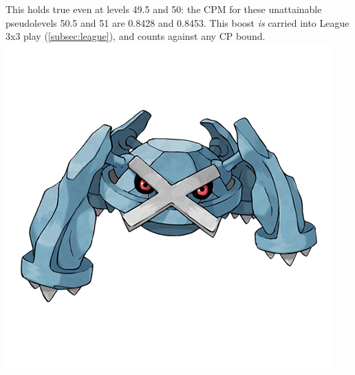 This holds true even at levels 49.5 and 50: the CPM for these unattainable
  pseudolevels 50.5 and 51 are 0.8428 and 0.8453.
This boost \textit{is} carried into League 3x3 play (\autoref{subsec:league}),
  and counts against any CP bound.
\vfill
\includegraphics[width=.9\linewidth,keepaspectratio]{images/metagross.png}

